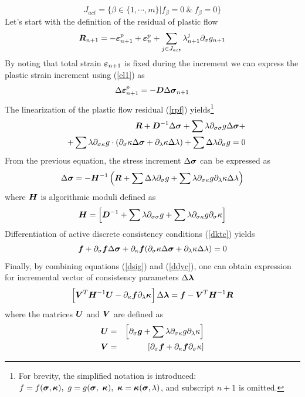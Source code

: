 \documentclass[epsf,a4paper]{article}
\newcommand{\mbf}[1]{\mbox{\boldmath$#1$}}
\newcommand{\ep}[0]{\mbf{\varepsilon}^p}
\newcommand{\e}{\mbf{\varepsilon}}
\newcommand{\sig}{\mbf{\sigma}}
\begin{document}
\begin{equation}
J_{act}=\{\beta\in\{1,\cdots,m\}|f_\beta=0\ \&\ \dot{f}_\beta=0\}
\end{equation}
Let's start with the definition of the residual of plastic flow
\begin{equation}
\label{rpf}
\mbf{R}_{n+1}=-\ep_{n+1}+\ep_{n}+\sum_{j\in J_{act}}\lambda^j_{n+1}\partial_\sigma g_{n+1}
\end{equation}
By noting that total strain $\e_{n+1}$ is fixed during the increment we can express the plastic strain increment using  (\ref{el1}) as
\begin{equation}
\Delta\ep_{n+1} = -\mbf{D}\Delta\sig_{n+1}
\end{equation}
The linearization of the plastic flow residual (\ref{rpf}) yields\footnote{For brevity, the simplified notation is introduced: $f=f(\sig,\mbf{\kappa}),\  g=g(\sig,\  \mbf{\kappa}),\  \mbf{\kappa}=\mbf{\kappa}(\sig,\lambda)$, and subscript $n+1$ is omitted.}
\begin{eqnarray}
\nonumber
&&\mbf{R}+\mbf{D}^{-1}\Delta\sig+\sum\lambda\partial_{\sigma\sigma}g\Delta\sig+\\
&&+\sum\lambda\partial_{\sigma\kappa}g\cdot(\partial_\sigma\kappa\Delta\sig+\partial_\lambda\kappa\Delta\lambda)+\sum\Delta\lambda\partial_{\sigma}g =0
\end{eqnarray}
From the previous equation, the stress increment $\Delta\sig$ can be expressed as 
\begin{equation}
\label{dsig}
\Delta\sig=-\mbf{H}^{-1}\left(\mbf{R}+\sum\Delta\lambda\partial_{\sigma}g+\sum\lambda\partial_{\sigma\kappa}g\partial_{\lambda}\kappa\Delta\lambda\right)
\end{equation}
where $\mbf{H}$ is algorithmic moduli defined as
\begin{equation}
\mbf{H}=\left[\mbf{D}^{-1}+\sum\lambda\partial_{\sigma\sigma}g+\sum\lambda\partial_{\sigma\kappa}g\partial_{\sigma}\kappa\right]
\end{equation}
Differentiation of active discrete consistency conditions (\ref{dktc}) yields
\begin{equation}
\label{ddyc}
\mbf{f}+\partial_{\sigma}\mbf{f}\Delta\sig+\partial_{\kappa}\mbf{f} (\partial_\sigma\kappa\Delta\sig+\partial_\lambda\kappa\Delta\lambda) =0  
\end{equation}
Finally, by combining equations (\ref{dsig}) and (\ref{ddyc}), one can obtain expression for incremental vector of consistency parameters $\Delta\mbf{\lambda}$
\begin{equation}
\left[\mbf{V}^T\mbf{H}^{-1}\mbf{U}-\partial_{\kappa}\mbf{f}\partial_{\lambda}\mbf{\kappa}\right]\Delta\mbf{\lambda}=\mbf{f}-\mbf{V}^T\mbf{H}^{-1}\mbf{R}
\end{equation}
where the matrices $\mbf{U}$ and $\mbf{V}$ are defined as
\begin{eqnarray}
\mbf{U} &=& \left[\partial_{\sigma}\mbf{g}+\sum\lambda\partial_{\sigma\kappa}g\partial_{\lambda}\kappa\right]\\
\mbf{V} &=& \left[\partial_{\sigma}\mbf{f}+\partial_{\kappa}\mbf{f}\partial_{\sigma}\kappa\right]
\end{eqnarray}
\end{document}
